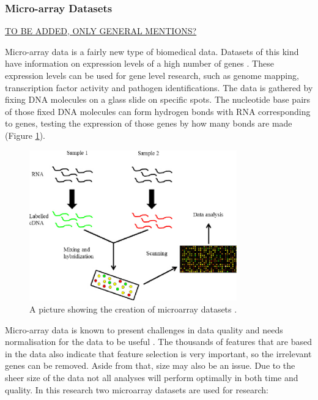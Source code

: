 \documentclass[10pt,a4paper]{report}
\begin{document}
	\subsubsection{Micro-array Datasets} \underline{TO BE ADDED, ONLY GENERAL MENTIONS?}
	\label{PLsubsec:Microarray}
	
	Micro-array data is a fairly new type of biomedical data. Datasets of this kind have information on expression levels of a high number of genes \cite{brazma2001minimum}. These expression levels can be used for gene level research, such as genome mapping, transcription factor activity and pathogen identifications. The data is gathered by fixing DNA molecules on a glass slide on specific spots. The nucleotide base pairs of those fixed DNA molecules can form hydrogen bonds with RNA corresponding to genes, testing the expression of those genes by how many bonds are made \cite{selvaraj2011microarray} (Figure \ref{fig:MicroArray}).
	
	\begin{figure}
		\includegraphics[width=0.8\textwidth]{MicroArray.png}
		\caption{A picture showing the creation of microarray datasets \cite{afzal2015fast}.}
		\label{fig:MicroArray}
	\end{figure}
	
	Micro-array data is known to present challenges in data quality and needs normalisation for the data to be useful \cite{selvaraj2011microarray}. The thousands of features that are based in the data also indicate that feature selection is very important, so the irrelevant genes can be removed. Aside from that, size may also be an issue. Due to the sheer size of the data not all analyses will perform optimally in both time and quality. In this research two microarray datasets are used for research:
	
\end{document}
